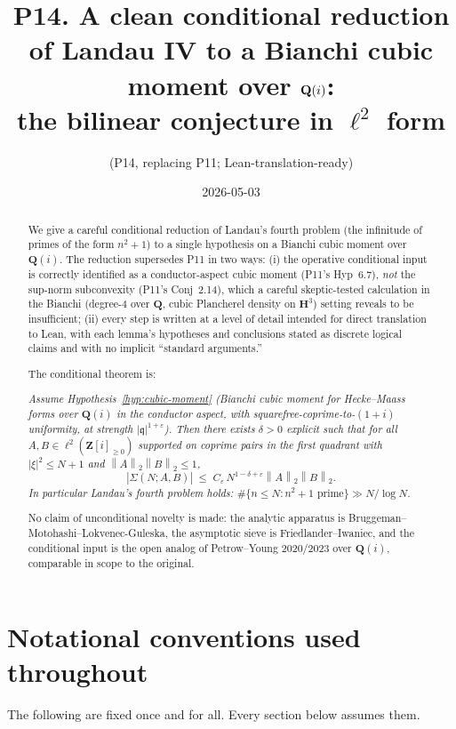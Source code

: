 \documentclass[11pt]{article}
\title{P14. A clean conditional reduction of Landau IV to a Bianchi cubic moment over $\Qi$:\\
the bilinear conjecture in $\ell^2$ form}
\author{(P14, replacing P11; Lean-translation-ready)}
\date{2026-05-03}
\theoremstyle{definition}
\newcommand{\Z}{\mathbf{Z}}
\newcommand{\Q}{\mathbf{Q}}
\newcommand{\HH}{\mathbf{H}}
\newcommand{\Zi}{\Z[i]}
\newcommand{\Qi}{\Q(i)}
\newcommand{\norm}[1]{\left\lVert #1\right\rVert}
\newcommand{\qq}{\mathfrak{q}}
\begin{document}
\maketitle

\begin{abstract}
We give a careful conditional reduction of Landau's fourth problem (the infinitude of primes of the form $n^2+1$) to a single hypothesis on a Bianchi cubic moment over $\Qi$. The reduction supersedes P11 in two ways: (i) the operative conditional input is correctly identified as a conductor-aspect cubic moment (P11's Hyp~6.7), \emph{not} the sup-norm subconvexity (P11's Conj~2.14), which a careful skeptic-tested calculation in the Bianchi (degree-4 over $\Q$, cubic Plancherel density on $\HH^3$) setting reveals to be insufficient; (ii) every step is written at a level of detail intended for direct translation to Lean, with each lemma's hypotheses and conclusions stated as discrete logical claims and with no implicit ``standard arguments.''

\smallskip
\noindent The conditional theorem is:

\smallskip\noindent\emph{Assume Hypothesis~\ref{hyp:cubic-moment} (Bianchi cubic moment for Hecke--Maass forms over $\Qi$ in the conductor aspect, with squarefree-coprime-to-$(1+i)$ uniformity, at strength $|\qq|^{1+\varepsilon}$). Then there exists $\delta>0$ explicit such that for all $A,B\in\ell^2(\Zi_{\ge0})$ supported on coprime pairs in the first quadrant with $|\xi|^2\le N+1$ and $\norm{A}_2\norm{B}_2\le 1$,}
\[
   |\Sigma(N;A,B)|\;\le\;C_\varepsilon\,N^{1-\delta+\varepsilon}\norm{A}_2\norm{B}_2.
\]
\emph{In particular Landau's fourth problem holds: $\#\{n\le N:n^2+1\text{ prime}\}\gg N/\log N$.}

\smallskip\noindent No claim of unconditional novelty is made: the analytic apparatus is Bruggeman--Motohashi--Lokvenec-Guleska, the asymptotic sieve is Friedlander--Iwaniec, and the conditional input is the open analog of Petrow--Young 2020/2023 over $\Qi$, comparable in scope to the original.
\end{abstract}

\tableofcontents

\section*{Notational conventions used throughout}\label{sec:conventions}

The following are fixed once and for all. Every section below assumes them.
\end{document}
